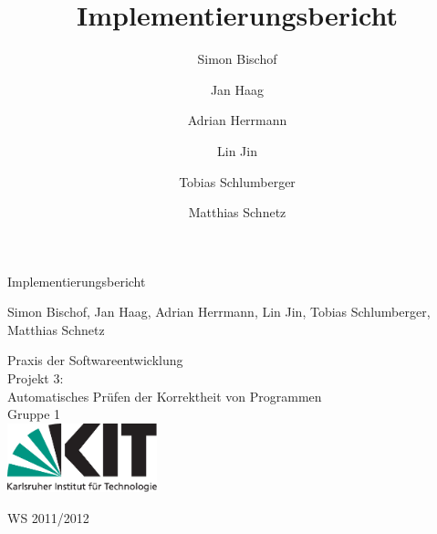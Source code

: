 \documentclass[a4paper,10pt]{article}
\title{Implementierungsbericht}
\author{Simon Bischof \and Jan Haag \and Adrian Herrmann \and Lin Jin \and Tobias Schlumberger \and Matthias Schnetz}
\begin{document}
\thispagestyle{empty}
\vspace*{4cm}
\begin{center}
\begin {huge}
Implementierungsbericht\\
\end{huge}
Simon Bischof, Jan Haag, Adrian Herrmann, Lin Jin, Tobias Schlumberger, Matthias Schnetz\\
\vspace{3cm}
\begin{huge}
Praxis der Softwareentwicklung \\
Projekt 3:\\
Automatisches Pr\"{u}fen der Korrektheit von Programmen\\
Gruppe 1\\
\vspace{2cm}
\includegraphics[height=2cm]{images/Kitlogo_de_rgb.pdf}\\[0.5cm]
\end{huge}
\begin{huge}
WS 2011/2012
\end{huge}
\end{center}
\newpage

\tableofcontents
\newpage







\end{document}
